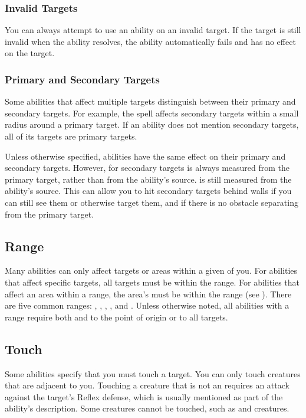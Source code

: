     \subsubsection{Invalid Targets}
      You can always attempt to use an ability on an invalid target.
      If the target is still invalid when the ability resolves, the ability automatically fails and has no effect on the target.

    \subsubsection{Primary and Secondary Targets}\label{Primary and Secondary Targets}
      Some abilities that affect multiple targets distinguish between their primary and secondary targets.
      For example, the  spell affects secondary targets within a small radius around a primary target.
      If an ability does not mention secondary targets, all of its targets are primary targets.

      Unless otherwise specified, abilities have the same effect on their primary and secondary targets.
      However,  for secondary targets is always measured from the primary target, rather than from the ability's source.
       is still measured from the ability's source.
      This can allow you to hit secondary targets behind walls if you can still see them or otherwise target them, and if there is no obstacle separating from the primary target.

  \subsection{Range}\label{Range}
    Many abilities can only affect targets or areas within a given  of you.
    For abilities that affect specific targets, all targets must be within the range.
    For abilities that affect an area within a range, the area's  must be within the range (see ).
    There are five common ranges: \shortrange, \medrange, \longrange, \distrange, and \extrange.
    Unless otherwise noted, all abilities with a range require both  and  to the point of origin or to all targets.

  \subsection{Touch}\label{Touch}
    Some abilities specify that you must touch a target.
    You can only touch creatures that are adjacent to you.
    Touching a creature that is not an  requires an attack against the target's Reflex defense, which is usually mentioned as part of the ability's description.
    Some creatures cannot be touched, such as  and  creatures.

